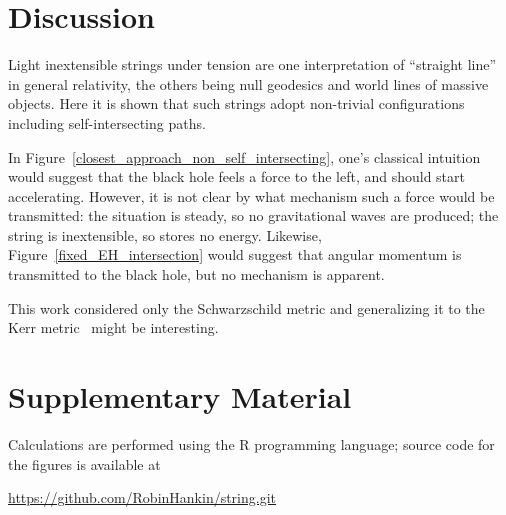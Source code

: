 \documentclass[times,twocolumn,final]{elsarticle}
\begin{document}
\section{Discussion}

Light inextensible strings under tension are one interpretation of
``straight line'' in general relativity, the others being null
geodesics and world lines of massive objects.  Here it is shown that
such strings adopt non-trivial configurations including
self-intersecting paths.

In Figure~\ref{closest_approach_non_self_intersecting}, one's
classical intuition would suggest that the black hole feels a force to
the left, and should start accelerating.  However, it is not clear by
what mechanism such a force would be transmitted: the situation is
steady, so no gravitational waves are produced; the string is
inextensible, so stores no energy.  Likewise,
Figure~\ref{fixed_EH_intersection} would suggest that angular momentum is
transmitted to the black hole, but no mechanism is apparent.

This work considered only the Schwarzschild metric and generalizing it
to the Kerr metric~\cite{kerr1963} might be interesting.  





\section*{Supplementary Material}

Calculations are performed using the R programming language; source
code for the figures is available at

\url{https://github.com/RobinHankin/string.git}
\end{document}
